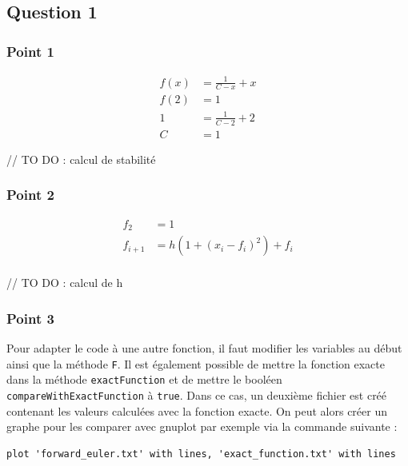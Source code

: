 \subsection{Question 1}

\subsubsection{Point 1}

\begin{equation}
	\begin{aligned}
		f(x) &= \frac{1}{C - x} + x\\
		f(2) &= 1\\
		1 &= \frac{1}{C - 2} + 2\\
		C &= 1
	\end{aligned}
\end{equation}

// TO DO : calcul de stabilité

\subsubsection{Point 2}

\begin{equation}
	\begin{aligned}
		f_2 &= 1\\
		f_{i+1} &= h(1 + (x_i - f_i)^2)+f_i\\
	\end{aligned}
\end{equation}

// TO DO : calcul de h

\subsubsection{Point 3}


Pour adapter le code à une autre fonction, il faut modifier les variables au début ainsi que la méthode \texttt{F}. Il est également possible de mettre la fonction exacte dans la méthode \texttt{exactFunction} et de mettre le booléen \texttt{compareWithExactFunction} à \texttt{true}. Dans ce cas, un deuxième fichier est créé contenant les valeurs calculées avec la fonction exacte. On peut alors créer un graphe pour les comparer avec gnuplot par exemple via la commande suivante :
\begin{lstlisting}
plot 'forward_euler.txt' with lines, 'exact_function.txt' with lines
\end{lstlisting}


